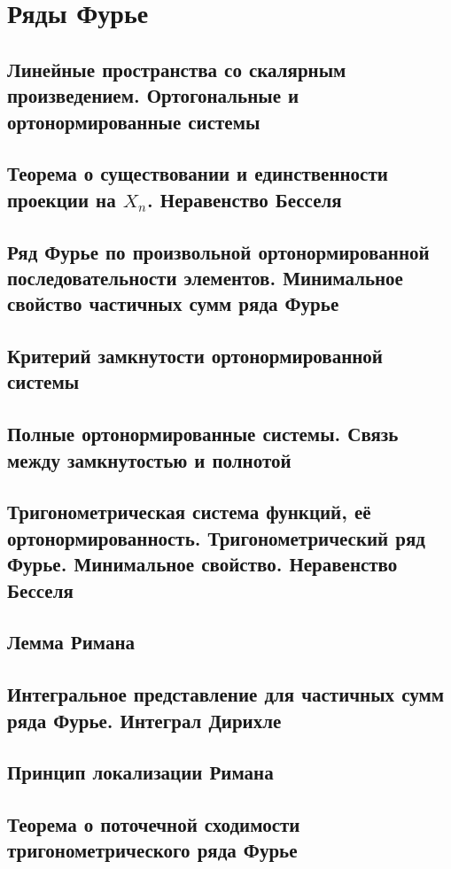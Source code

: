 \section{Ряды Фурье}
\subsection{Линейные пространства со скалярным произведением. Ортогональные и ортонормированные системы}
\subsection{Теорема о существовании и единственности проекции на $X_n$. Неравенство Бесселя}
\subsection{Ряд Фурье по произвольной ортонормированной последовательности элементов. Минимальное свойство частичных сумм ряда Фурье}
\subsection{Критерий замкнутости ортонормированной системы}
\subsection{Полные ортонормированные системы. Связь между замкнутостью и полнотой}
\subsection{Тригонометрическая система функций, её ортонормированность. Тригонометрический ряд Фурье. Минимальное свойство. Неравенство Бесселя}
\subsection{Лемма Римана}
\subsection{Интегральное представление для частичных сумм ряда Фурье. Интеграл Дирихле}
\subsection{Принцип локализации Римана}
\subsection{Теорема о поточечной сходимости тригонометрического ряда Фурье}
